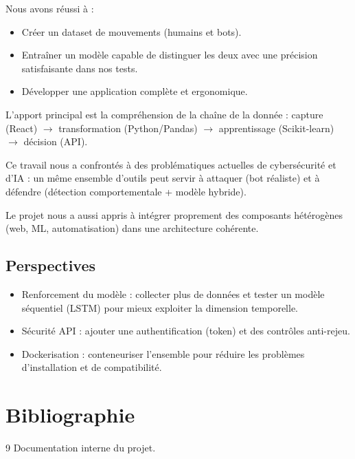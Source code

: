 \documentclass[a4paper, 12pt, twoside]{article}
\begin{document}
Nous avons réussi à :
\begin{itemize}
    \item Créer un dataset de mouvements (humains et bots).
    \item Entraîner un modèle capable de distinguer les deux avec une précision satisfaisante dans nos tests.
    \item Développer une application complète et ergonomique.
\end{itemize}

L'apport principal est la compréhension de la chaîne de la donnée : capture (React) $\rightarrow$ transformation (Python/Pandas) $\rightarrow$ apprentissage (Scikit-learn) $\rightarrow$ décision (API).

Ce travail nous a confrontés à des problématiques actuelles de cybersécurité et d'IA : un même ensemble d'outils peut servir à attaquer (bot réaliste) et à défendre (détection comportementale + modèle hybride).

Le projet nous a aussi appris à intégrer proprement des composants hétérogènes (web, ML, automatisation) dans une architecture cohérente.

\subsection{Perspectives}
\begin{itemize}
    \item Renforcement du modèle : collecter plus de données et tester un modèle séquentiel (LSTM) pour mieux exploiter la dimension temporelle.
    \item Sécurité API : ajouter une authentification (token) et des contrôles anti-rejeu.
    \item Dockerisation : conteneuriser l'ensemble pour réduire les problèmes d'installation et de compatibilité.
\end{itemize}

\section{Bibliographie}
\renewcommand{\bibname}{}
\renewcommand{\refname}{}
\begin{thebibliography}{9}
 Documentation interne du projet.
\end{thebibliography}

\end{document}
